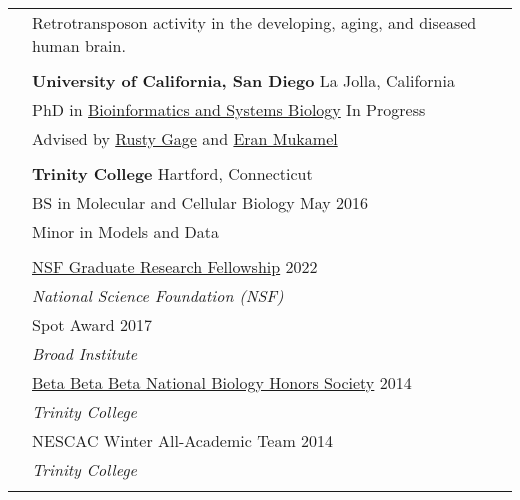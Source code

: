 \documentclass[letterpaper, 11pt]{article}
\begin{document}
\begin{longtable}{p{1.6in}p{4.9in}}


\nohyphens{\color{OliveGreen}{Research interests}}
& Retrotransposon activity in the developing, aging, and diseased human brain. \\
& \\


\color{OliveGreen}{Education} 
& \textbf{University of California, San Diego} \hfill La Jolla, California \\ 
& PhD in \href{https://bioinformatics.ucsd.edu/}{Bioinformatics and Systems Biology} \hfill In Progress \\
& Advised by \href{https://www.salk.edu/scientist/rusty-gage/}{Rusty Gage} and \href{https://cogsci.ucsd.edu/people/faculty/eran-mukamel.html}{Eran Mukamel} \\
& \\

& \textbf{Trinity College} \hfill Hartford, Connecticut \\
& BS in Molecular and Cellular Biology \hfill May 2016 \\
& Minor in Models and Data \\
& \\



{\color{OliveGreen}{Honors and}} 
{\color{OliveGreen}{Awards}} 
& \href{https://www.nsfgrfp.orgresources/about-grfp/}{NSF Graduate Research Fellowship} \hfill 2022\\
& \hspace{0.1in} \textit{National Science Foundation (NSF)} \\
& Spot Award \hfill 2017 \\
& \hspace{0.1in} \textit{Broad Institute} \\
& \href{https://www.tribeta.org/about-beta-beta-beta}{Beta Beta Beta National Biology Honors Society} \hfill 2014 \\
& \hspace{0.1in} \textit{Trinity College} \\
& NESCAC Winter All-Academic Team \hfill 2014 \\
& \hspace{0.1in} \textit{Trinity College} \\
& \\


\end{longtable}
\end{document}

